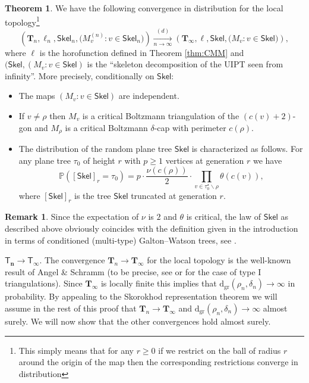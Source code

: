 \documentclass[10pt]{amsart}
\theoremstyle{definition}\newtheorem{defi}[theo]{Definition}\newtheorem{rema}[theo]{Remark}\newtheorem{exam}[theo]{Example}\newtheorem{exem}[theo]{Example}\newtheorem{nota}[theo]{Notation}
\newtheorem{theorem}[theo]{Theorem}\newtheorem{thm}[theo]{Theorem}\newtheorem{lemma}[theo]{Lemma}\newtheorem{proposition}[theo]{Proposition}\newtheorem{corollary}[theo]{Corollary}\newtheorem{remark}[theo]{Remark}\newtheorem{definition}[theo]{Definition}
\begin{document}
\begin{theorem} \label{thm:skeletoninfinity} We have the following convergence in distribution for the local topology\footnote{This simply means that for any $r\geq 0$ if we restrict on the ball of radius $r$ around the origin of the map then the corresponding restrictions converge in distribution}
$$ \left( \mathbf{T}_{n}, \ell_{n}, \mathsf{Skel}_{n} , \big( M_{v}^{(n)} : v \in \mathsf{Skel}_{n} \big)\right) \xrightarrow[n\to\infty]{(d)} \left( \mathbf{T}_{\infty}, \ell, \mathsf{Skel}, \big( M_{v} : v \in \mathsf{Skel} \big)\right),$$
where $\ell$ is the horofunction defined in Theorem \ref{thm:CMM} and $(\mathsf{Skel}, ( M_{v} : v \in \mathsf{Skel} )$ is the ``skeleton decomposition of the UIPT seen from infinity''. More precisely, conditionally on $ \mathsf{Skel}$:
\begin{itemize}
\item The maps $(M_{v} : v \in \mathsf{Skel})$ are independent.
\item If $v \ne \rho$ then $M_{v}$ is a critical Boltzmann triangulation of the $(c(v)+2)$-gon and $M_{\rho}$ is a critical Boltzmann $\delta$-cap with perimeter $c(\rho)$.
\item The distribution of the random plane tree $ \mathsf{Skel}$ is characterized as follows. For any plane tree $\tau_{0}$ of height $r$ with $p \geq 1$ vertices at generation $r$ we have
$$ \mathbb{P}([ \mathsf{Skel}]_{r} = \tau_{0}) = p \cdot \frac{\nu( c(\rho))}{2} \cdot \prod_{v \in \tau_{0}^{\star}\backslash \rho} \theta( c(v)),$$
where $[ \mathsf{Skel}]_{r}$ is the tree $ \mathsf{Skel}$ truncated at generation $r$.
\end{itemize}
\end{theorem}

\begin{remark}
Since the expectation of $\nu$ is $2$ and $\theta$ is critical, the law of $ \mathsf{Skel}$ as described above obviously coincides with the definition given in the introduction in terms of conditioned (multi-type) Galton--Watson trees, see \cite{ADG}.\end{remark}
\proof  $ \boldsymbol{\mathsf{T}_{n} \to \mathsf{T}_{\infty}}$. The convergence $ \mathbf{T}_{n} \to \mathbf{T}_{\infty}$ for the local topology is the well-known result of Angel \& Schramm (to be precise, see \cite{Ste14} or \cite{CLGfpp} for the case of type I triangulations). Since $ \mathbf{T}_{\infty}$ is locally finite this implies that $ \mathrm{d_{gr}}(\rho_{n}, \delta_{n}) \to \infty$ in probability. By appealing to the Skorokhod representation theorem we will assume in the rest of this proof that $ \mathbf{T}_{n} \to \mathbf{T}_{\infty}$ and $ \mathrm{d_{gr}}( \rho_{n}, \delta_{n}) \to \infty$ almost surely. We will now show that the other convergences hold almost surely.
\end{document}
